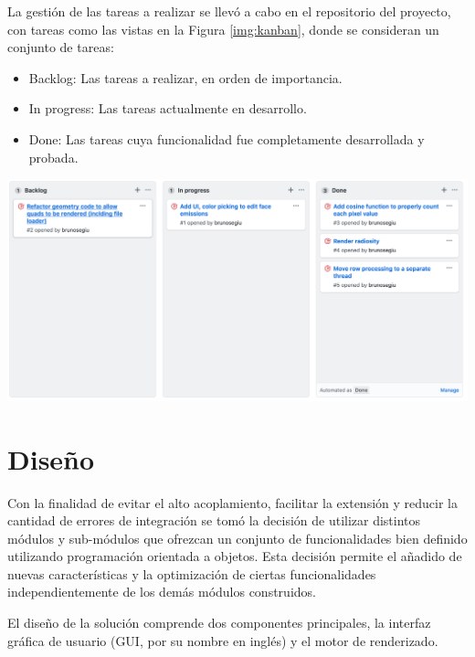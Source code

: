 La gestión de las tareas a realizar se llevó a cabo en el repositorio del proyecto, con tareas como las vistas en la Figura \ref{img:kanban}, donde se consideran un conjunto de tareas:

\begin{itemize}
	\item Backlog: Las tareas a realizar, en orden de importancia.
	\item In progress: Las tareas actualmente en desarrollo.
	\item Done: Las tareas cuya funcionalidad fue completamente desarrollada y probada.
\end{itemize}

\vspace{5mm}
\begin{minipage}[h]{0.8\linewidth}
	\centering
	\includegraphics[width=\linewidth]{assets/kanban}
	\label{img:kanban}
\end{minipage}

\section{Diseño}
\label{sec:disenio}

Con la finalidad de evitar el alto acoplamiento, facilitar la extensión y reducir la cantidad de errores de integración se tomó la decisión de utilizar distintos módulos y sub-módulos que ofrezcan un conjunto de funcionalidades bien definido utilizando programación orientada a objetos. Esta decisión permite el añadido de nuevas características y la optimización de ciertas funcionalidades independientemente de los demás módulos construidos.

El diseño de la solución comprende dos componentes principales, la interfaz gráfica de usuario (GUI, por su nombre en inglés) y el motor de renderizado.

